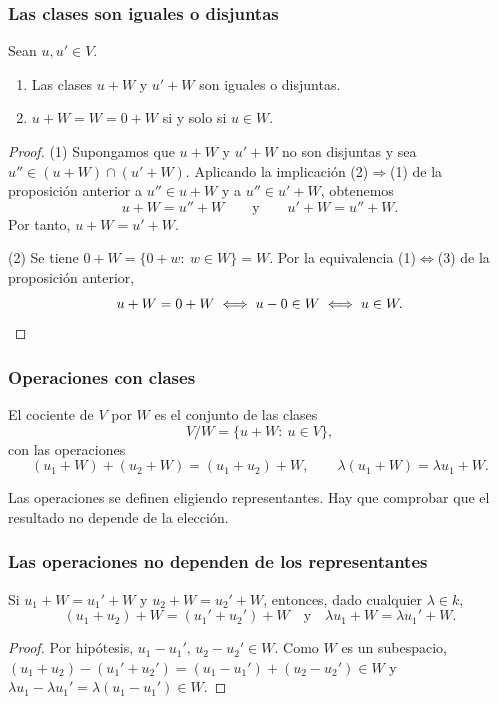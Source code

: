 \begin{frame}[allowframebreaks, t]
    \frametitle{Las clases son iguales o disjuntas}

    \begin{corollary}
        Sean $u,u'\in V$.
        \begin{enumerate}[(1)]
            \item Las clases $u+W$ y $u'+W$ son \alert{iguales o disjuntas}.
            \item $u+W=W=0+W$ si y solo si $u\in W$.
        \end{enumerate}
    \end{corollary}

    \begin{proof}
        \alert{(1)} Supongamos que $u+W$ y $u'+W$ no son disjuntas y sea
        $u''\in(u+W)\cap(u'+W)$. Aplicando la implicación
        (2)$\Rightarrow$(1) de la proposición anterior a $u''\in u+W$ y a
        $u''\in u'+W$, obtenemos
        \[
            u+W=u''+W
            \qquad\text{y}\qquad
            u'+W=u''+W.
        \]
        Por tanto, $u+W=u'+W$.

        \medskip

        \alert{(2)} Se tiene $0+W=\{0+w:\ w\in W\}=W$. Por la equivalencia
        (1)$\Leftrightarrow$(3) de la proposición anterior,
        \[
            u+W=0+W\iff u-0\in W\iff u\in W.\qedhere
        \]
    \end{proof}
\end{frame}


\begin{frame}
    \frametitle{Operaciones con clases}

    \begin{definition}
        El \alert{cociente} de $V$ por $W$ es el conjunto de las clases
        \[
            V/W=\{u+W:\ u\in V\},
        \]
        con las operaciones
        \[
            (u_1+W)+(u_2+W)=(u_1+u_2)+W,
            \qquad
            \lambda(u_1+W)=\lambda u_1+W.
        \]
    \end{definition}

    Las operaciones se definen eligiendo representantes. Hay que comprobar
    que el resultado \alert{no depende} de la elección.
\end{frame}


\begin{frame}
    \frametitle{Las operaciones no dependen de los representantes}

    \begin{lemma}
        Si $u_1+W=u_1'+W$ y $u_2+W=u_2'+W$, entonces, dado cualquier $\lambda\in k$,
        \[
            (u_1+u_2)+W=(u_1'+u_2')+W
            \quad\text{y}\quad
            \lambda u_1+W=\lambda u_1'+W.
        \]
    \end{lemma}

    \begin{proof}
        Por hipótesis, $u_1-u_1',\,u_2-u_2'\in W$. Como $W$ es un subespacio,
        $(u_1+u_2)-(u_1'+u_2')=(u_1-u_1')+(u_2-u_2')\in W$ y
        $\lambda u_1-\lambda u_1'=\lambda(u_1-u_1')\in W$.
    \end{proof}
\end{frame}


